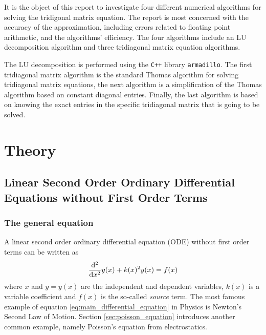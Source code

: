 \documentclass[reprint,english]{revtex4-1}
\begin{document}
It is the object of this report to investigate four different numerical algorithms for solving the tridigonal matrix equation. The report is most concerned with the accuracy of the approximation, including errors related to floating point arithmetic, and the algorithms' efficiency. The four algorithms include an LU decomposition algorithm and three tridiagonal matrix equation algorithms.

The LU decomposition is performed using the \texttt{C++} library \texttt{armadillo}. The first tridiagonal matrix algorithm is the standard Thomas algorithm for solving tridiagonal matrix equations, the next algorithm is a simplification of the Thomas algorithm based on constant diagonal entries. Finally, the last algorithm is based on knowing the exact entries in the specific tridiagonal matrix that is going to be solved.
\section{Theory}
\subsection{Linear Second Order Ordinary Differential Equations without First Order Terms}
\subsubsection{The general equation}
A linear second order ordinary differential equation (ODE) without first order terms can be written as
\begin{equation}\label{eq:main_differential_equation}
\dv[2]{x}y(x)+k(x)^2y(x)=f(x)
\end{equation}
where \(x\) and \(y=y(x)\) are the independent and dependent variables, \(k(x)\) is a variable coefficient and \(f(x)\) is the so-called \emph{source} term. The most famous example of equation \eqref{eq:main_differential_equation} in Physics is Newton's Second Law of Motion. Section \ref{sec:poisson_equation} introduces another common example, namely Poisson's equation from electrostatics.
\end{document}
